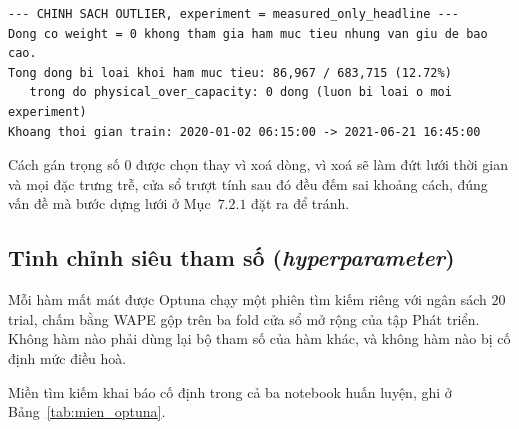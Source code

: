 \begingroup
\par{}\vspace{8pt}
\footnotesize\renewcommand{\baselinestretch}{1.0}\selectfont
\begin{verbatim}
--- CHINH SACH OUTLIER, experiment = measured_only_headline ---
Dong co weight = 0 khong tham gia ham muc tieu nhung van giu de bao cao.
Tong dong bi loai khoi ham muc tieu: 86,967 / 683,715 (12.72%)
   trong do physical_over_capacity: 0 dong (luon bi loai o moi experiment)
Khoang thoi gian train: 2020-01-02 06:15:00 -> 2021-06-21 16:45:00
\end{verbatim}
\par\vspace{8pt}
\endgroup
Cách gán trọng số $0$ được chọn thay vì xoá dòng, vì xoá sẽ làm đứt lưới thời gian và mọi đặc
trưng trễ, cửa sổ trượt tính sau đó đều đếm sai khoảng cách, đúng vấn đề mà bước dựng lưới ở
Mục~$7.2.1$ đặt ra để tránh.

\FloatBarrier
\subsection{Tinh chỉnh siêu tham số (\textit{hyperparameter})}

Mỗi hàm mất mát được Optuna chạy một phiên tìm kiếm riêng với ngân sách $20$ trial,
chấm bằng WAPE gộp trên ba fold cửa sổ mở rộng của tập Phát triển. Không hàm nào phải dùng lại
bộ tham số của hàm khác, và không hàm nào bị cố định mức điều hoà.

Miền tìm kiếm khai báo cố định trong cả ba notebook huấn luyện, ghi ở
Bảng~\ref{tab:mien_optuna}.

